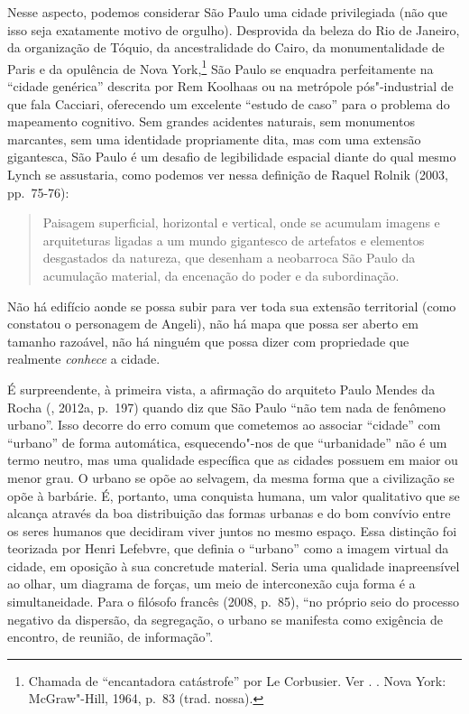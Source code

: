 Nesse aspecto, podemos considerar São Paulo uma cidade privilegiada (não
que isso seja exatamente motivo de orgulho). Desprovida da beleza do Rio
de Janeiro, da organização de Tóquio, da ancestralidade do Cairo, da
monumentalidade de Paris e da opulência de Nova York,\footnote{Chamada de
  ``encantadora catástrofe'' por Le Corbusier. Ver . {}. Nova York:
  McGraw"-Hill, 1964, p.~83 (trad. nossa).} São Paulo se enquadra
perfeitamente na ``cidade genérica'' descrita por Rem Koolhaas ou na
metrópole pós"-industrial de que fala Cacciari, oferecendo um excelente
``estudo de caso'' para o problema do mapeamento cognitivo. Sem grandes
acidentes naturais, sem monumentos marcantes, sem uma identidade
propriamente dita, mas com uma extensão gigantesca, São Paulo é um
desafio de legibilidade espacial diante do qual mesmo Lynch se
assustaria, como podemos ver nessa definição de Raquel Rolnik (2003, pp.~75-76):

\begin{quote}
Paisagem superficial, horizontal e vertical, onde se acumulam imagens e
arquiteturas ligadas a um mundo gigantesco de artefatos e elementos
desgastados da natureza, que desenham a neobarroca São Paulo da
acumulação material, da encenação do poder e da subordinação.
\end{quote}

Não há edifício aonde se possa subir para ver toda sua extensão
territorial (como constatou o personagem de Angeli), não há mapa que
possa ser aberto em tamanho razoável, não há ninguém que possa dizer com
propriedade que realmente \emph{conhece} a cidade.

É surpreendente, à primeira vista, a afirmação do arquiteto Paulo Mendes
da Rocha (, 2012a, p.~197) quando diz que São Paulo ``não tem nada
de fenômeno urbano''. Isso decorre do erro comum que cometemos ao
associar ``cidade'' com ``urbano'' de forma automática, esquecendo"-nos
de que ``urbanidade'' não é um termo neutro, mas uma qualidade
específica que as cidades possuem em maior ou menor grau. O urbano se
opõe ao selvagem, da mesma forma que a civilização se opõe à barbárie.
É, portanto, uma conquista humana, um valor qualitativo que se alcança
através da boa distribuição das formas urbanas e do bom convívio entre
os seres humanos que decidiram viver juntos no mesmo espaço. Essa
distinção foi teorizada por Henri Lefebvre, que definia o ``urbano''
como a imagem virtual da cidade, em oposição à sua concretude material.
Seria uma qualidade inapreensível ao olhar, um diagrama de forças, um
meio de interconexão cuja forma é a simultaneidade. Para o filósofo
francês (2008, p.~85), ``no próprio seio do processo negativo da
dispersão, da segregação, o urbano se manifesta como exigência de
encontro, de reunião, de informação''.

